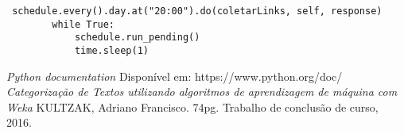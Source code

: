 \documentclass[12pt]{article}
\begin{document}
 \begin{lstlisting}
 schedule.every().day.at("20:00").do(coletarLinks, self, response)
        while True:
            schedule.run_pending()
            time.sleep(1) 
 \end{lstlisting}

 

 


\begin{thebibliography}{9}
 \emph{Python documentation}
 Disponível em: https://www.python.org/doc/
 \emph{Categorização de Textos utilizando algoritmos de
aprendizagem de máquina com Weka}
KULTZAK, Adriano Francisco.
74pg. Trabalho de conclusão de curso, 2016.

\end{thebibliography}
\end{document}
